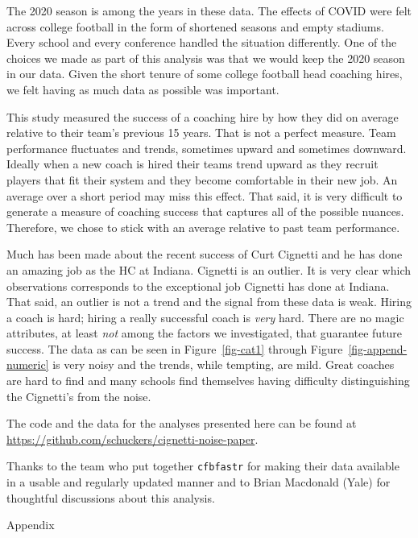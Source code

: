 \documentclass[
  12pt]{article}
\begin{document}
The 2020 season is among the years in these data. The effects of COVID
were felt across college football in the form of shortened seasons and
empty stadiums. Every school and every conference handled the situation
differently. One of the choices we made as part of this analysis was
that we would keep the 2020 season in our data. Given the short tenure
of some college football head coaching hires, we felt having as much
data as possible was important.

This study measured the success of a coaching hire by how they did on
average relative to their team's previous 15 years. That is not a
perfect measure. Team performance fluctuates and trends, sometimes
upward and sometimes downward. Ideally when a new coach is hired their
teams trend upward as they recruit players that fit their system and
they become comfortable in their new job. An average over a short period
may miss this effect. That said, it is very difficult to generate a
measure of coaching success that captures all of the possible nuances.
Therefore, we chose to stick with an average relative to past team
performance.

Much has been made about the recent success of Curt Cignetti and he has
done an amazing job as the HC at Indiana. Cignetti is an outlier. It is
very clear which observations corresponds to the exceptional job
Cignetti has done at Indiana. That said, an outlier is not a trend and
the signal from these data is weak. Hiring a coach is hard; hiring a
really successful coach is \emph{very} hard. There are no magic
attributes, at least \emph{not} among the factors we investigated, that
guarantee future success. The data as can be seen in
Figure~\ref{fig-cat1} through Figure~\ref{fig-append-numeric} is very
noisy and the trends, while tempting, are mild. Great coaches are hard
to find and many schools find themselves having difficulty
distinguishing the Cignetti's from the noise.

The code and the data for the analyses presented here can be found at
\url{https://github.com/schuckers/cignetti-noise-paper}.

Thanks to the team who put together \texttt{cfbfastr} for making their
data available in a usable and regularly updated manner and to Brian
Macdonald (Yale) for thoughtful discussions about this analysis.

Appendix
\end{document}
